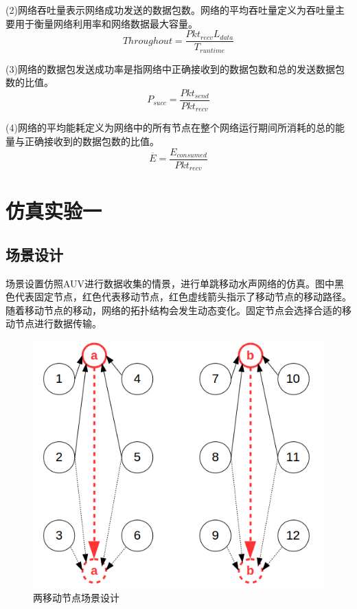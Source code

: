 (2)网络吞吐量表示网络成功发送的数据包数。网络的平均吞吐量定义为吞吐量主要用于衡量网络利用率和网络数据最大容量。
\begin{equation}
Throughout=\frac{Pkt_{recv} L_{data}}{T_{runtime}}
\end{equation}

(3)网络的数据包发送成功率是指网络中正确接收到的数据包数和总的发送数据包数的比值。
\begin{equation}
P_{succ}=\frac{Pkt_{send}}{Pkt_{recv}}
\end{equation}

(4)网络的平均能耗定义为网络中的所有节点在整个网络运行期间所消耗的总的能量与正确接收到的数据包数的比值。
\begin{equation}
\overline E=\frac{E_{consumed}}{Pkt_{recv}}
\end{equation}

\section {仿真实验一}
\subsection{场景设计}
场景设置仿照AUV进行数据收集的情景，进行单跳移动水声网络的仿真。图中黑色代表固定节点，红色代表移动节点，红色虚线箭头指示了移动节点的移动路径。随着移动节点的移动，网络的拓扑结构会发生动态变化。固定节点会选择合适的移动节点进行数据传输。

 \begin{figure}[!ht]
 	\centering
 	\includegraphics[scale=0.5]{figures/2scen.png}
 	\caption{
 		两移动节点场景设计
 	}
 	\label{fig:example}
 \end{figure}

